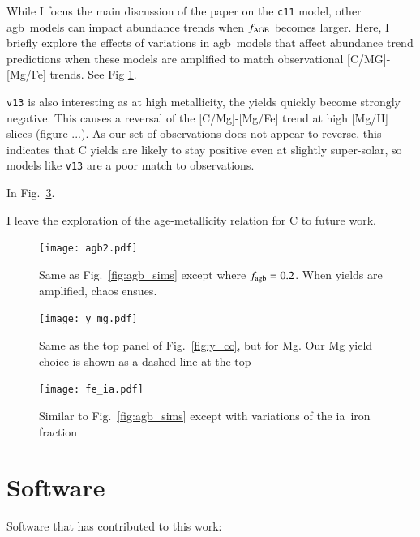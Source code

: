 \documentclass[12pt,oneside,letterpaper]{report}
\newcommand{\agb}{\gls{agb}}
\newcommand{\ia}{\gls{ia}}
\newcommand{\cxi}{\texttt{\gls{c11}}}
\newcommand{\vxiii}{\texttt{\gls{v13}}}
\begin{document}
While I focus the main discussion of the paper on the \cxi{} model, other \agb\ models can impact abundance trends when $f_{\rm AGB}$ becomes larger.
Here, I briefly explore the effects of variations in \agb\ models that affect abundance trend predictions when these models are amplified to match observational [C/MG]-[Mg/Fe] trends. 
See Fig \ref{fig:fagb2}.

\vxiii{} is also interesting as at high metallicity, the yields quickly become strongly negative. This causes a reversal of the [C/Mg]-[Mg/Fe] trend at high [Mg/H] slices (figure ...). As our set of observations does not appear to reverse, this indicates that C yields are likely to stay positive even at slightly super-solar, so models like \vxiii{} are a poor match to observations. 

In Fig.~\ref{fig:fe_ia}.

I leave the exploration of the age-metallicity relation for C to future work.


\begin{figure}[htp]
    \centering
    \texttt{[image: agb2.pdf]}

    \caption[Alternate low mass star yield models]{Same as Fig.~\ref{fig:agb_sims} except where $f_{\rm agb}=0.2$. When yields are amplified, chaos ensues.}
    \label{fig:fagb2}
\end{figure}


\begin{figure}[htp]
    \centering
    \texttt{[image: y\_mg.pdf]}
    \caption[Magnesium yields]{Same as the top panel of Fig.~\ref{fig:y_cc}, but for Mg. Our Mg yield choice is shown as a dashed line at the top
    }
    \label{fig:y_mg}
\end{figure}

\begin{figure}
    \centering
    \texttt{[image: fe\_ia.pdf]}
    \caption[Adjusting type Ia iron]{Similar to Fig.~\ref{fig:agb_sims} except with variations of the \ia\ iron fraction}
    \label{fig:fe_ia}
\end{figure}




\newpage

\section{Software}

Software that has contributed to this work:
\end{document}
